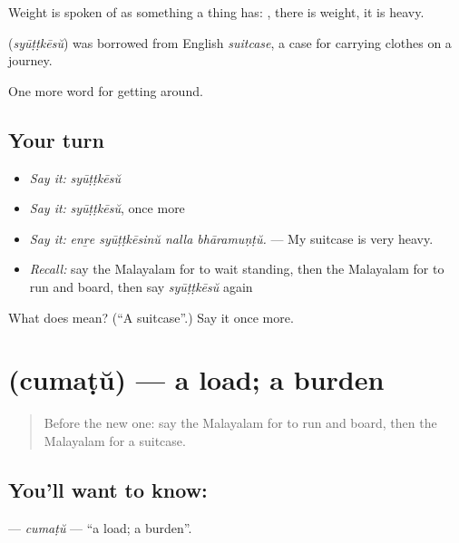 Weight is spoken of as something a thing has: , there is weight, it is heavy.

\begin{cousinweb}
\textbf{} (\emph{syūṭṭkēsŭ}) was borrowed from English \emph{suitcase}, a case for carrying clothes on a journey.
\end{cousinweb}

\begin{grammarlens}[title={What you've built}]
One more word for getting around.
\end{grammarlens}

\subsection*{Your turn}
\begin{itemize}
\raggedright
  \item \emph{Say it:} \emph{syūṭṭkēsŭ}
  \item \emph{Say it:} \emph{syūṭṭkēsŭ}, once more
  \item \emph{Say it:} \emph{enṟe syūṭṭkēsinŭ nalla bhāramuṇṭŭ.} — My suitcase is very heavy.
  \item \emph{Recall:} say the Malayalam for to wait standing, then the Malayalam for to run and board, then say \emph{syūṭṭkēsŭ} again
\end{itemize}

\begin{tcolorbox}[breakable,colback=teal!4,colframe=teal!35!black,title={Before you move on}]
What does  mean? (\textquotedblleft{}A suitcase\textquotedblright{}.) Say it once more.
\end{tcolorbox}
\section[\texorpdfstring{\ml{ചുമട്} (cumaṭŭ)}{ചുമട് (cumaṭŭ)}]{ (cumaṭŭ) — a load; a burden}

\label{lesson:ML-C466-cumatu}



\begin{quote}
Before the new one: say the Malayalam for to run and board, then the Malayalam for a suitcase.
\end{quote}

\subsection*{You'll want to know: }
\textbf{} — \emph{cumaṭŭ} — \textquotedblleft{}a load; a burden\textquotedblright{}.

